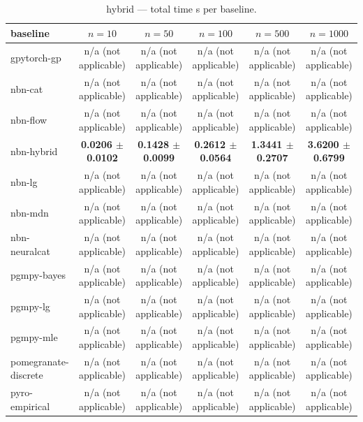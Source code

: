 \begin{table}[h]
\centering
\caption{hybrid — total time s per baseline.}
\label{tab:hybrid_total_time_s}
\begin{tabular}{lccccc}
\toprule
baseline & $n=10$ & $n=50$ & $n=100$ & $n=500$ & $n=1000$ \\
\midrule
gpytorch-gp & n/a (not applicable) & n/a (not applicable) & n/a (not applicable) & n/a (not applicable) & n/a (not applicable) \\
nbn-cat & n/a (not applicable) & n/a (not applicable) & n/a (not applicable) & n/a (not applicable) & n/a (not applicable) \\
nbn-flow & n/a (not applicable) & n/a (not applicable) & n/a (not applicable) & n/a (not applicable) & n/a (not applicable) \\
nbn-hybrid & \textbf{0.0206 $\pm$ 0.0102} & \textbf{0.1428 $\pm$ 0.0099} & \textbf{0.2612 $\pm$ 0.0564} & \textbf{1.3441 $\pm$ 0.2707} & \textbf{3.6200 $\pm$ 0.6799} \\
nbn-lg & n/a (not applicable) & n/a (not applicable) & n/a (not applicable) & n/a (not applicable) & n/a (not applicable) \\
nbn-mdn & n/a (not applicable) & n/a (not applicable) & n/a (not applicable) & n/a (not applicable) & n/a (not applicable) \\
nbn-neuralcat & n/a (not applicable) & n/a (not applicable) & n/a (not applicable) & n/a (not applicable) & n/a (not applicable) \\
pgmpy-bayes & n/a (not applicable) & n/a (not applicable) & n/a (not applicable) & n/a (not applicable) & n/a (not applicable) \\
pgmpy-lg & n/a (not applicable) & n/a (not applicable) & n/a (not applicable) & n/a (not applicable) & n/a (not applicable) \\
pgmpy-mle & n/a (not applicable) & n/a (not applicable) & n/a (not applicable) & n/a (not applicable) & n/a (not applicable) \\
pomegranate-discrete & n/a (not applicable) & n/a (not applicable) & n/a (not applicable) & n/a (not applicable) & n/a (not applicable) \\
pyro-empirical & n/a (not applicable) & n/a (not applicable) & n/a (not applicable) & n/a (not applicable) & n/a (not applicable) \\
\bottomrule
\end{tabular}
\end{table}

